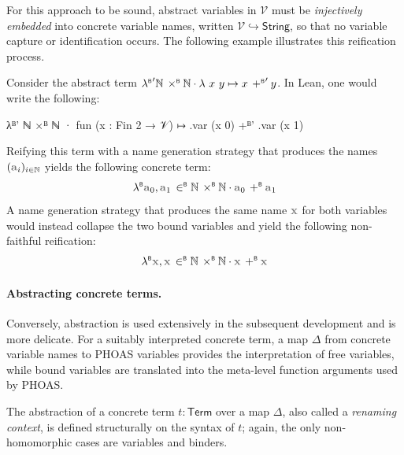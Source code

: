 For this approach to be sound, abstract variables in \(\mathcal{V}\) must be
\emph{injectively embedded} into concrete variable names, written
\(\mathcal{V} \hookrightarrow \mathsf{String}\), so that no variable capture or
identification occurs.
The following example illustrates this reification process.

\begin{example}
  Consider the abstract term \(\mathord{\lambda^{\scriptscriptstyle{\mathsf{B}}}}' \mathbb{N} \mathbin{\,\times^{\scriptscriptstyle{\mathsf{B}}}} \mathbb{N} \cdot \lambda\ x\ y \mapsto x \mathbin{\,+^{\scriptscriptstyle{\mathsf{B}}}}' y\).
  In Lean, one would write the following:
  \begin{leanlisting}
λᴮ' ℕ ×ᴮ ℕ · fun (x : Fin 2 → 𝒱) ↦ .var (x 0) +ᴮ' .var (x 1)
\end{leanlisting}
  Reifying this term with a name generation strategy that produces the names \((\var{a}_i)_{i \in \mathbb{N}}\) yields the following concrete term:
  \[
    \lambdaB \var{a}_0, \var{a}_1 \inB \mathbb{N} \prodB \mathbb{N} \cdot \var{a}_0 \addB \var{a}_1
  \]
  A name generation strategy that produces the same name \(\var{x}\) for both
  variables would instead collapse the two bound variables and yield the
  following non-faithful reification:
  \[
    \lambdaB \var{x}, \var{x} \inB \mathbb{N} \prodB \mathbb{N} \cdot \var{x} \addB \var{x}
  \]
\end{example}


\paragraph{Abstracting concrete terms.}
Conversely, abstraction is used extensively in the subsequent development and
is more delicate.
For a suitably interpreted concrete term, a map \(\Delta\) from concrete
variable names to PHOAS variables provides the interpretation of free variables,
while bound variables are translated into the meta-level function arguments used
by PHOAS.

The abstraction of a concrete term \(t : \mathsf{Term}\) over a map
\(\Delta\), also called a \emph{renaming context}, is defined structurally on
the syntax of \(t\); again, the only non-homomorphic cases are variables and
binders.

